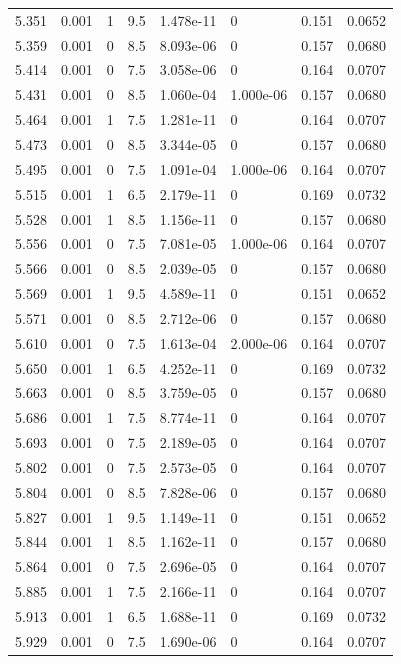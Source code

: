 \documentclass[preview]{standalone}
\begin{document}
{{{{{{\begin{tabular}{L{1.2cm}C{1.2cm} C{0.3cm}C{0.5cm} C{1.4cm}C{1.4cm} C{1.4cm}C{1.4cm}}
  5.351  &  0.001  & 1     & 9.5 &  1.478e-11  & 0  & 0.151 &  0.0652   \\ 
  5.359  &  0.001  & 0     & 8.5 &  8.093e-06  & 0  & 0.157 &  0.0680   \\ 
  5.414  &  0.001  & 0     & 7.5 &  3.058e-06  & 0  & 0.164 &  0.0707   \\ 
  5.431  &  0.001  & 0     & 8.5 &  1.060e-04  & 1.000e-06  & 0.157 &  0.0680   \\ 
  5.464  &  0.001  & 1     & 7.5 &  1.281e-11  & 0  & 0.164 &  0.0707   \\ 
  5.473  &  0.001  & 0     & 8.5 &  3.344e-05  & 0  & 0.157 &  0.0680   \\ 
  5.495  &  0.001  & 0     & 7.5 &  1.091e-04  & 1.000e-06  & 0.164 &  0.0707   \\ 
  5.515  &  0.001  & 1     & 6.5 &  2.179e-11  & 0  & 0.169 &  0.0732   \\ 
  5.528  &  0.001  & 1     & 8.5 &  1.156e-11  & 0  & 0.157 &  0.0680   \\ 
  5.556  &  0.001  & 0     & 7.5 &  7.081e-05  & 1.000e-06  & 0.164 &  0.0707   \\ 
  5.566  &  0.001  & 0     & 8.5 &  2.039e-05  & 0  & 0.157 &  0.0680   \\ 
  5.569  &  0.001  & 1     & 9.5 &  4.589e-11  & 0  & 0.151 &  0.0652   \\ 
  5.571  &  0.001  & 0     & 8.5 &  2.712e-06  & 0  & 0.157 &  0.0680   \\ 
  5.610  &  0.001  & 0     & 7.5 &  1.613e-04  & 2.000e-06  & 0.164 &  0.0707   \\ 
  5.650  &  0.001  & 1     & 6.5 &  4.252e-11  & 0  & 0.169 &  0.0732   \\ 
  5.663  &  0.001  & 0     & 8.5 &  3.759e-05  & 0  & 0.157 &  0.0680   \\ 
  5.686  &  0.001  & 1     & 7.5 &  8.774e-11  & 0  & 0.164 &  0.0707   \\ 
  5.693  &  0.001  & 0     & 7.5 &  2.189e-05  & 0  & 0.164 &  0.0707   \\ 
  5.802  &  0.001  & 0     & 7.5 &  2.573e-05  & 0  & 0.164 &  0.0707   \\ 
  5.804  &  0.001  & 0     & 8.5 &  7.828e-06  & 0  & 0.157 &  0.0680   \\ 
  5.827  &  0.001  & 1     & 9.5 &  1.149e-11  & 0  & 0.151 &  0.0652   \\ 
  5.844  &  0.001  & 1     & 8.5 &  1.162e-11  & 0  & 0.157 &  0.0680   \\ 
  5.864  &  0.001  & 0     & 7.5 &  2.696e-05  & 0  & 0.164 &  0.0707   \\ 
  5.885  &  0.001  & 1     & 7.5 &  2.166e-11  & 0  & 0.164 &  0.0707   \\ 
  5.913  &  0.001  & 1     & 6.5 &  1.688e-11  & 0  & 0.169 &  0.0732   \\ 
  5.929  &  0.001  & 0     & 7.5 &  1.690e-06  & 0  & 0.164 &  0.0707   \\ 
\hline 
\end{tabular} 

}}}}}}
\end{document}
